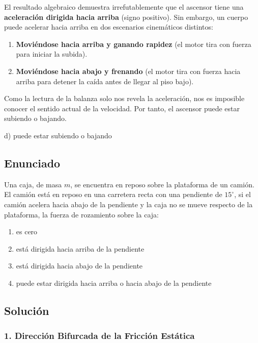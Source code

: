 \documentclass[12pt, a4paper]{article}
\begin{document}
El resultado algebraico demuestra irrefutablemente que el ascensor tiene una \textbf{aceleración dirigida hacia arriba} (signo positivo). 
Sin embargo, un cuerpo puede acelerar hacia arriba en dos escenarios cinemáticos distintos:
\begin{enumerate}
    \item \textbf{Moviéndose hacia arriba y ganando rapidez} (el motor tira con fuerza para iniciar la subida).
    \item \textbf{Moviéndose hacia abajo y frenando} (el motor tira con fuerza hacia arriba para detener la caída antes de llegar al piso bajo).
\end{enumerate}
Como la lectura de la balanza solo nos revela la aceleración, nos es imposible conocer el sentido actual de la velocidad. Por tanto, el ascensor puede estar subiendo o bajando.

\begin{tcolorbox}[colback=green!5!white, colframe=green!50!black, title=Respuesta Final]
\centering \Large d) puede estar subiendo o bajando
\end{tcolorbox}

\newpage

\subsection*{Enunciado}
Una caja, de masa $m$, se encuentra en reposo sobre la plataforma de un camión. El camión está en reposo en una carretera recta con una pendiente de $15^\circ$, si el camión acelera hacia abajo de la pendiente y la caja no se mueve respecto de la plataforma, la fuerza de rozamiento sobre la caja:
\begin{enumerate}[label=\alph*)]
    \item es cero
    \item está dirigida hacia arriba de la pendiente
    \item está dirigida hacia abajo de la pendiente
    \item puede estar dirigida hacia arriba o hacia abajo de la pendiente
\end{enumerate}

\subsection*{Solución}

\subsubsection*{1. Dirección Bifurcada de la Fricción Estática}
\end{document}

